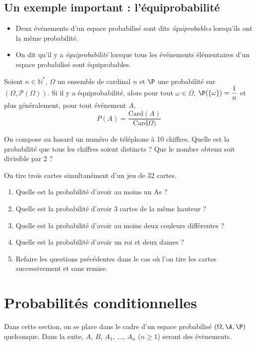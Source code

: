 \documentclass[a4paper,10pt]{report}
\begin{document}
\subsection{Un exemple important : l'équiprobabilité}

\begin{defin}
 \begin{itemize}
 \item Deux événements d'un espace probabilisé sont dits \textit{équiprobables} lorsqu'ils ont la même probabilité.
\item On dit qu'il y a \textit{équiprobabilité} lorsque tous les événements élémentaires d'un espace probabilisé sont équiprobables.
 \end{itemize}
\end{defin}
\begin{thm}
 Soient $n \in \mathbb{N}^*$, $\Omega$ un ensemble de cardinal $n$ et $\P$ une probabilité sur $(\Omega,\mathcal{P}(\Omega))$. Si il y a équiprobabilité, alors pour tout $\omega \in \Omega$,
$ \P(\{\omega\}) = \dfrac 1n$ et plus généralement, pour tout événement $A$, 
$$P(A) = \frac{\textrm{Card}(A)}{\textrm{Card}\Omega)}$$
\end{thm}

\begin{ex} On compose au hasard un numéro de téléphone à 10 chiffres. Quelle est la probabilité que tous les chiffres soient distincts ? Que le nombre obtenu soit divisible par 2 ?

\vspace{5cm}
\end{ex}

\begin{exa}
On tire trois cartes simultanément d'un jeu de 32 cartes.
\begin{enumerate}
 \item Quelle est la probabilité d'avoir au moins un As ?
 \item Quelle est la probabilité d'avoir 3 cartes de la même hauteur ?
 \item Quelle est la probabilité d'avoir au moins deux couleurs différentes ?
 \item Quelle est la probabilité d'avoir un roi et deux dames ?
 \item Refaire les questions précédentes dans le cas où l'on tire les cartes successivement et sans remise.
\end{enumerate}
\end{exa}

\section{Probabilités conditionnelles}
\noindent Dans cette section, on se place dans le cadre d'un espace probabilisé $(\Omega, \A, \P)$ quelconque. Dans la suite, $A$, $B$, $A_1$, $\ldots$, $A_n$ ($n \geq 1$) seront des évènements.
\end{document}
